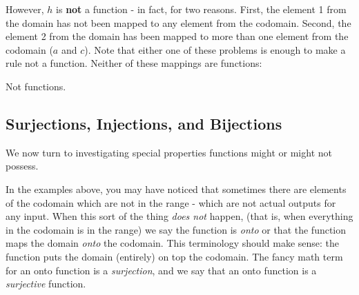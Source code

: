 \documentclass[12pt]{article}
\begin{document}
\begin{example}
\begin{solution}
  However, $h$ is \textbf{not} a function - in fact, for two reasons.  First, the element 1 from the domain has not been mapped to any element from the codomain.  Second, the element 2 from the domain has been mapped to more than one element from the codomain ($a$ and $c$).  Note that either one of these problems is enough to make a rule not a function.  Neither of these mappings are functions:
  \begin{center}
    \begin{multicols}{2}
       

    \end{multicols}
  Not functions.
  \end{center}

\end{solution}

\end{example}

\subsection{Surjections, Injections, and Bijections}

We now turn to investigating special properties functions might or might not possess.  

In the examples above, you may have noticed that sometimes there are elements of the codomain which are not in the range - which are not actual outputs for any input.  When this sort of the thing \emph{does not} happen, (that is, when everything in the codomain is in the range) we say the function is \emph{onto} or that the function maps the domain \emph{onto} the codomain.  This terminology should make sense: the function puts the domain (entirely) on top the codomain.  The fancy math term for an onto function is a \emph{surjection}, and we say that an onto function is a \emph{surjective} function.
\end{document}
